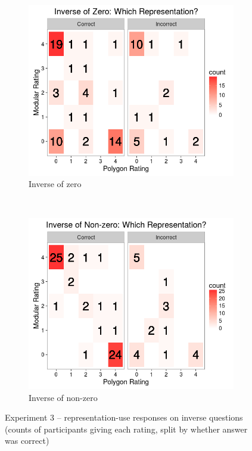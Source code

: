 \documentclass[man,10pt]{apa6}
\begin{document}
\begin{figure}
\centering
\begin{subfigure}[c]{0.45\textwidth}
\centering 
\includegraphics[width=\textwidth]{figures/3/wr_inZ.png}
\caption{Inverse of zero}
\end{subfigure}
~
\begin{subfigure}[c]{0.45\textwidth}
\centering 
\includegraphics[width=\textwidth]{figures/3/wr_inNZ.png}
\caption{Inverse of non-zero}
\end{subfigure}
\caption{Experiment 3 -- representation-use responses on inverse questions (counts of participants giving each rating, split by whether answer was correct)}
\label{ex3_wr_in}
\end{figure}\noindent
\end{document}
